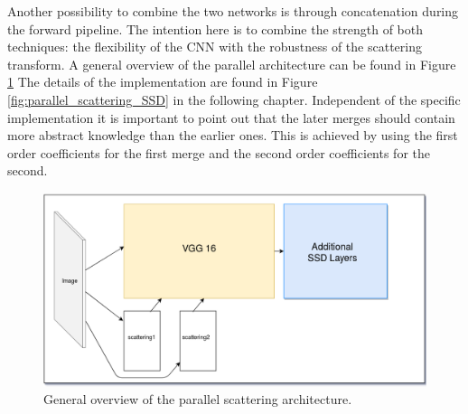 Another possibility to combine the two networks is through concatenation during the forward pipeline. The intention here is to combine the strength of both techniques: the flexibility of the CNN with the robustness of the scattering transform. A general overview of the parallel architecture can be found in Figure \ref{fig:parallel_scattering_overview} The details of the implementation are found in Figure \ref{fig:parallel_scattering_SSD} in the following chapter. Independent of the specific implementation it is important to point out that the later merges should contain more abstract knowledge than the earlier ones. This is achieved by using the first order coefficients for the first merge and the second order coefficients for the second. 

\begin{figure}[!htb]
	\centering
	\includegraphics[width=\textwidth]{images/parallel_scattering_overview.png}
	\caption{General overview of the parallel scattering architecture.}
	\label{fig:parallel_scattering_overview}	
\end{figure}
